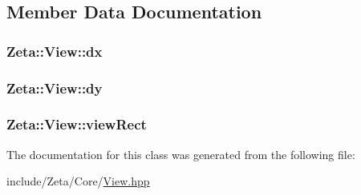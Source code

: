 \subsection{Member Data Documentation}
\hypertarget{classZeta_1_1View_adf5ca5e43a40a4632feffd60ce8d254d}{
\subsubsection[{dx}]{ Zeta\+::\+View\+::dx\hspace{0.3cm}{\ttfamily [protected]}}}\label{classZeta_1_1View_adf5ca5e43a40a4632feffd60ce8d254d}
\hypertarget{classZeta_1_1View_aceed4f0c37e9cd9a8a94aee93e3f4fbc}{
\subsubsection[{dy}]{ Zeta\+::\+View\+::dy\hspace{0.3cm}{\ttfamily [protected]}}}\label{classZeta_1_1View_aceed4f0c37e9cd9a8a94aee93e3f4fbc}
\hypertarget{classZeta_1_1View_ac851c9951abf6517e3d1d6f431ee9e24}{
\subsubsection[{view\+Rect}]{ Zeta\+::\+View\+::view\+Rect\hspace{0.3cm}{\ttfamily [protected]}}}\label{classZeta_1_1View_ac851c9951abf6517e3d1d6f431ee9e24}


The documentation for this class was generated from the following file\+:\begin{DoxyCompactItemize}
\item 
include/\+Zeta/\+Core/\hyperlink{View_8hpp}{View.\+hpp}\end{DoxyCompactItemize}
